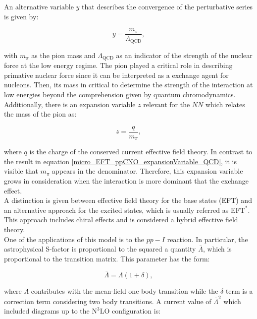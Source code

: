\documentclass[openany]{book}
\begin{document}
An alternative variable $y$ that describes the convergence of the perturbative series is given by:

 \begin{equation}\label{micro_EFT_ppCNO_expansionVariable_QCD}
 	y = \frac{m_\pi}{\Lambda_{\mathrm{QCD}}},
 \end{equation}

with $m_\pi$ as the pion mass and $\Lambda_{\mathrm{QCD}}$ as an indicator of the strength of the nuclear force at the low energy regime. The pion played a critical role in describing primative nuclear force since it can be interpreted as a exchange agent for nucleons. Then, its mass in critical to determine the strength of the interaction at low energies beyond the comprehension given by quantum chromodynamics. \\

Additionally, there is an expansion variable $z$ relevant for the $NN$ which relates the mass of the pion as: 

 \begin{equation}\label{micro_EFT_ppCNO_expansionVariable_2}
	z = \frac{q}{m_\pi},
\end{equation}

where $q$ is the charge of the conserved current effective field theory. In contrast to the result in equation \ref{micro_EFT_ppCNO_expansionVariable_QCD}, it is visible that $m_\pi$ appears in the denominator. Therefore, this expansion variable grows in consideration when the interaction is more dominant that the exchange effect. \\

A distinction is given between effective field theory for the base states (EFT) and an alternative approach for the excited states, which is usually referred as $\mathrm{EFT}^{*}$. This approach includes chiral effects and is considered a hybrid effective field theory.  \\

One of the applications of this model is to the $pp-I$ reaction. In particular, the astrophysical S-factor is proportional to the squared a quantity $\bar \Lambda $, which is proportional to the transition matrix. This parameter has the form: 

\begin{equation}\label{micro_EFT_ppCNO_Lambda}
	\bar\Lambda  = \Lambda (1 + \delta),
\end{equation}

where $\Lambda$ contributes with the mean-field one body transition while the $\delta$ term is a correction term considering two body transitions. A current value of $\bar \Lambda^2$ which included diagrams up to the $\mathrm{N^3LO}$ configuration is: 
\end{document}
